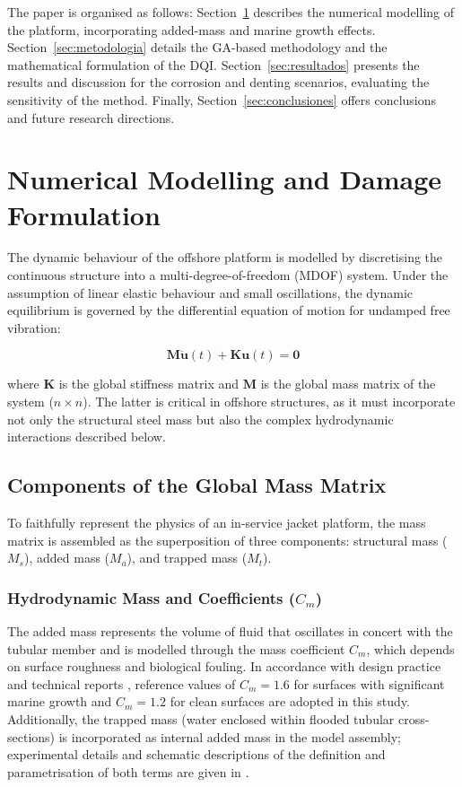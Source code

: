 \documentclass[preprint,12pt]{elsarticle}
\begin{document}
The paper is organised as follows: Section~\ref{sec:modelado} describes the numerical modelling of the platform, incorporating added-mass and marine growth effects. Section~\ref{sec:metodologia} details the GA-based methodology and the mathematical formulation of the DQI. Section~\ref{sec:resultados} presents the results and discussion for the corrosion and denting scenarios, evaluating the sensitivity of the method. Finally, Section~\ref{sec:conclusiones} offers conclusions and future research directions.

\section{Numerical Modelling and Damage Formulation}
\label{sec:modelado}

The dynamic behaviour of the offshore platform is modelled by discretising the continuous structure into a multi-degree-of-freedom (MDOF) system. Under the assumption of linear elastic behaviour and small oscillations, the dynamic equilibrium is governed by the differential equation of motion for undamped free vibration:

\begin{equation}
    \label{eq:ec_movimiento}
    \mathbf{M}\ddot{\mathbf{u}}(t) + \mathbf{K}\mathbf{u}(t) = \mathbf{0}
\end{equation}

\noindent where $\mathbf{K}$ is the global stiffness matrix and $\mathbf{M}$ is the global mass matrix of the system ($n \times n$). The latter is critical in offshore structures, as it must incorporate not only the structural steel mass but also the complex hydrodynamic interactions described below.

\subsection{Components of the Global Mass Matrix}

To faithfully represent the physics of an in-service jacket platform, the mass matrix is assembled as the superposition of three components: structural mass ($M_s$), added mass ($M_a$), and trapped mass ($M_t$).

\subsubsection{Hydrodynamic Mass and Coefficients (\texorpdfstring{$C_m$}{Cm})}
The added mass represents the volume of fluid that oscillates in concert with the tubular member and is modelled through the mass coefficient $C_m$, which depends on surface roughness and biological fouling. In accordance with design practice and technical reports \citep{API2014_manual,CardenasArias2019_article}, reference values of $C_m=1.6$ for surfaces with significant marine growth and $C_m=1.2$ for clean surfaces are adopted in this study. Additionally, the trapped mass (water enclosed within flooded tubular cross-sections) is incorporated as internal added mass in the model assembly; experimental details and schematic descriptions of the definition and parametrisation of both terms are given in \citep{CardenasArias2019_article}.
\end{document}
